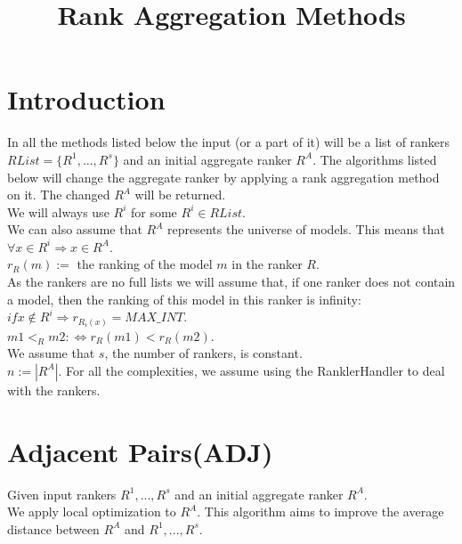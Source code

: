\documentclass{article}
\date{\vspace{-5ex}}
\begin{document}
	\title{Rank Aggregation Methods}
	\maketitle
	\section{Introduction}
	In all the methods listed below the input (or a part of it) will be a list of rankers $RList = \{R^1,...,R^s\}$ and an initial 				aggregate ranker $R^A$. The algorithms listed below will change the aggregate ranker by applying a rank aggregation method on 	it. The changed $R^A$ will be returned.\\
	
	We will always use $R^i$ for some $R^i \in RList$.\\
	We can also assume that $R^A$ represents the universe of models. This means that $\forall x \in R^i \Rightarrow x \in R^A$.\\
	$r_R(m) := $ the ranking of the model $m$ in the ranker $R$.\\
	As the rankers are no full lists we will assume that, if one ranker does not contain a model, then the ranking of this model in this ranker is infinity: $if x \notin R^i \Rightarrow r_{R_i(x)} = MAX\_INT $.\\
	$m1 <_{R} m2 :\Leftrightarrow r_R(m1) < r_R(m2)$.\\ 
	We assume that $s$, the number of rankers, is constant.\\
	$n := |R^A|$.
	For all the complexities, we assume using the RanklerHandler to deal with the rankers.
 	 
	
	\section{Adjacent Pairs(ADJ) \cite{A} \cite{LK}} 
	 
	  Given input rankers $R^1,...,R^s$ and an initial aggregate ranker $R^A$.\\
	  We apply local optimization to $R^A$. This algorithm aims to improve the average distance between $R^A$ and $
	  R^1,...,R^s$.\\
	  
\end{document}
